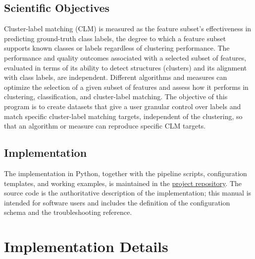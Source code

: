 \documentclass[a4paper,12pt]{article}
\begin{document}
\subsection{Scientific Objectives}
Cluster-label matching (CLM) is measured as the feature subset's effectiveness in predicting ground-truth class labels, the degree to which a feature subset supports known classes or labels regardless of clustering performance. The performance and quality outcomes associated with a selected subset of features, evaluated in terms of its ability to detect structures (clusters) and its alignment with class labels, are independent. Different algorithms and measures can optimize the selection of a given subset of features and assess how it performs in clustering, classification, and cluster-label matching. The objective of this program is to create datasets that give a user granular control over labels and match specific cluster-label matching targets, independent of the clustering, so that an algorithm or measure can reproduce specific CLM targets.

\subsection{Implementation}
The implementation in Python, together with the pipeline scripts, configuration templates, and working examples, is maintained in the \href{https://github.com/A-Gharibian/CLMSynth}{project repository}. The source code is the authoritative description of the implementation; this manual is intended for software users and includes the definition of the configuration schema and the troubleshooting reference.
\newpage

\section{Implementation Details}
\end{document}
